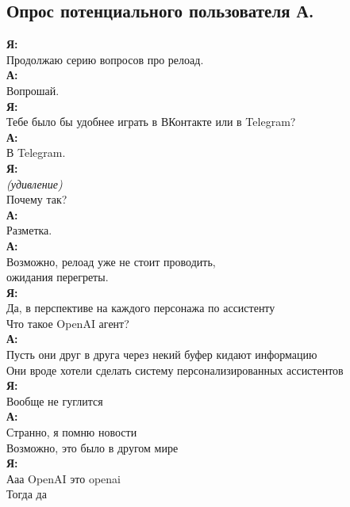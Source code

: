 \subsection{Опрос потенциального пользователя А.}
\textbf{Я:}\\
Продолжаю серию вопросов про релоад.\\

\textbf{А:}\\
Вопрошай.\\

\textbf{Я:}\\
Тебе было бы удобнее играть в ВКонтакте или в Telegram?\\

\textbf{А:}\\
В Telegram.\\

\textbf{Я:}\\
\textit{(удивление)}\\
Почему так?\\

\textbf{А:}\\
Разметка.\\

\textbf{А:}\\
Возможно, релоад уже не стоит проводить,\\
ожидания перегреты.\\

\textbf{Я:}\\
Да, в перспективе на каждого персонажа по ассистенту\\
Что такое OpenAI агент?\\

\textbf{А:}\\
Пусть они друг в друга через некий буфер кидают информацию\\
Они вроде хотели сделать систему персонализированных ассистентов\\

\textbf{Я:}\\
Вообще не гуглится\\

\textbf{А:}\\
Странно, я помню новости\\
Возможно, это было в другом мире\\

\textbf{Я:}\\
Ааа OpenAI это openai\\
Тогда да\\


